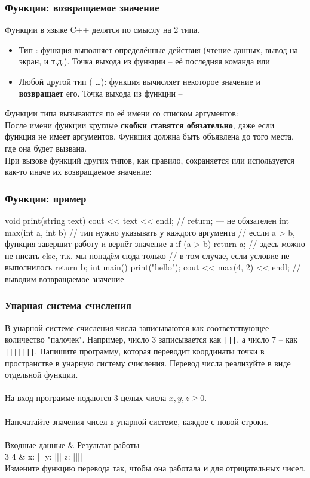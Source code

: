 \documentclass[PDF,10pt,usenames,dvipsnames,t,fragile]{beamer}
\newcommand{\inp}{\vspace{4pt}\\ \vspace{4pt}{\bf Входные данные} \\} %
\newcommand{\out}{\vspace{4pt}\\ \vspace{4pt}{\bf Результат работы} \\} %
\newcommand{\tb}{\\ \hline} %
\newenvironment{ex}{\vspace{4pt}\\ \vspace{4pt}{\bf Пример} \\
\tabularx{\textwidth}{|>{\tt}X|>{\tt}X|}
\hline \sf Входные данные & \sf Результат работы \tb}{\endtabularx}
\begin{document}
\begin{frame}
	\frametitle{Функции: возвращаемое значение}
	Функции в языке C++ делятся по смыслу на 2 типа.
	\begin{itemize}
		\item Тип : функция выполняет определённые действия (чтение
			данных, вывод на экран, и т.д.). Точка выхода из функции -- её последняя
			команда или 
		\item Любой другой тип ( \dots): функция вычисляет
			некоторое значение и {\bf возвращает} его. Точка выхода из функции --
	\end{itemize}
	Функции типа  вызываются по её имени со списком аргументов:
	\\
	После имени функции круглые {\bf скобки ставятся обязательно}, даже если функция не
	имеет аргументов. Функция должна быть объявлена до того места, где она будет
	вызвана. \\

	При вызове функций других типов, как правило, сохраняется или используется
	как-то иначе их возвращаемое значение: \\
\end{frame}

\begin{frame}[fragile]
	\frametitle{Функции: пример}
	\begin{code}
void print(string text)
{
	cout << text << endl;
	// return; — не обязателен
}
int max(int a, int b) // тип нужно указывать у каждого аргумента
{
	// ессли a > b, функция завершит работу и вернёт значение а
	if (a > b) return a;
	// здесь можно не писать else, т.к. мы попадём сюда только
	// в том случае, если условие не выполнилось
	return b;
}
int main()
{
	print("hello");
	cout << max(4, 2) << endl; // выводим возвращаемое значение
}
	\end{code}
\end{frame}

\begin{frame}
	\frametitle{Унарная система счисления}
В унарной системе счисления числа записываются как соответствующее
	количество "палочек". Например, число 3 записывается как {\tt |||}, а число 7 – как
	{\tt |||||||}. Напишите программу, которая переводит координаты точки в пространстве
	в унарную систему счисления. Перевод числа реализуйте в виде отдельной
	функции.
	\inp
	На вход программе подаются 3 целых числа $x, y, z \geq 0$. 
	\out
	Напечатайте значения чисел в унарной системе, каждое с новой строки.
	\begin{ex}
		2 3 4 & x: || \newline y: ||| \newline z: |||| \tb
	\end{ex}
	{\bf *}Измените функцию перевода так, чтобы она работала и для отрицательных
	чисел.
\end{frame}
\end{document}

